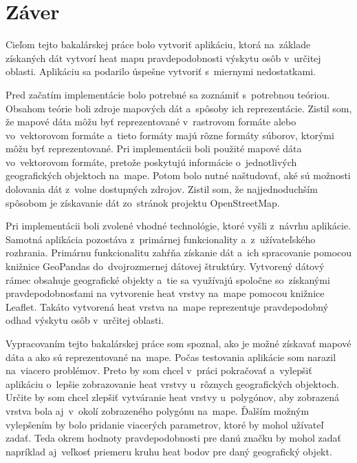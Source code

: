 \chapter{Záver}
\label{chap:zaver}
Cieľom tejto bakalárskej práce bolo vytvoriť aplikáciu, ktorá na~základe získaných dát vytvorí heat mapu pravdepodobnosti výskytu osôb v~určitej oblasti. Aplikáciu sa podarilo úspešne vytvoriť s~miernymi nedostatkami.

Pred začatím implementácie bolo potrebné sa zoznámiť s~potrebnou teóriou. Obsahom teórie boli zdroje mapových dát a~spôsoby ich reprezentácie. Zistil som, že mapové dáta môžu byť reprezentované v~rastrovom formáte alebo vo~vektorovom formáte a~tieto formáty majú rôzne formáty súborov, ktorými môžu byť reprezentované. Pri implementácii boli použité mapové dáta vo~vektorovom formáte, pretože poskytujú informácie o~jednotlivých geografických objektoch na~mape. Potom bolo nutné naštudovať, aké sú možnosti dolovania dát z~volne dostupných zdrojov. Zistil som, že najjednoduchším spôsobom je získavanie dát zo~stránok projektu OpenStreetMap.

Pri implementácii boli zvolené vhodné technológie, ktoré vyšli z~návrhu aplikácie. Samotná aplikácia pozostáva z~primárnej funkcionality a~z~užívateľského rozhrania. Primárnu funkcionalitu zahŕňa získanie dát a~ich spracovanie pomocou knižnice GeoPandas do~dvojrozmernej dátovej štruktúry. Vytvorený dátový rámec obsahuje geografické objekty a~tie sa využívajú spoločne so~získanými pravdepodobnosťami na vytvorenie heat vrstvy na~mape pomocou knižnice Leaflet. Takáto vytvorená heat vrstva na~mape reprezentuje pravdepodobný odhad výskytu osôb v~určitej oblasti.

Vypracovaním tejto bakalárskej práce som spoznal, ako je možné získavať mapové dáta a ako sú reprezentované na~mape. Počas testovania aplikácie som narazil na~viacero problémov. Preto by som chcel v~práci pokračovať a~vylepšiť aplikáciu o~lepšie zobrazovanie heat vrstvy u~rôznych geografických objektoch. Určite by som chcel zlepšiť vytváranie heat vrstvy u~polygónov, aby zobrazená vrstva bola aj~v~okolí zobrazeného polygónu na~mape. Ďalším možným vylepšením by bolo pridanie viacerých parametrov, ktoré by mohol užívateľ zadať. Teda okrem hodnoty pravdepodobnosti pre danú značku by mohol zadať napríklad aj~veľkosť priemeru kruhu heat bodov pre daný geografický objekt.
